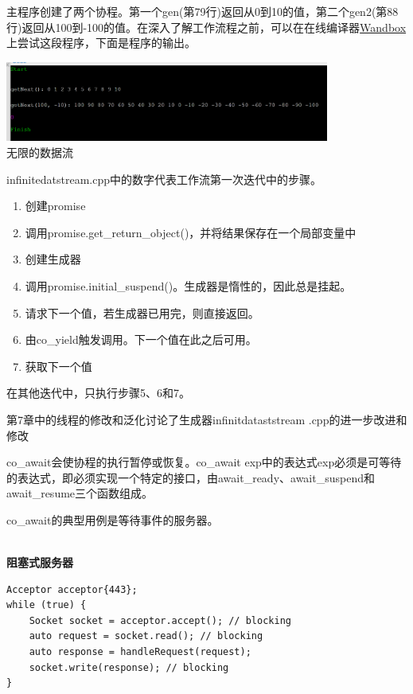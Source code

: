 主程序创建了两个协程。第一个gen(第79行)返回从0到10的值，第二个gen2(第88行)返回从100到-100的值。在深入了解工作流程之前，可以在在线编译器\href{https://wandbox.org/}{Wandbox}上尝试这段程序，下面是程序的输出。

\begin{center}
\includegraphics[width=0.8\textwidth]{content/3/chapter6/images/5.png}\\
无限的数据流
\end{center}

infinitedatstream.cpp中的数字代表工作流第一次迭代中的步骤。

\begin{enumerate}
\item 
创建promise

\item 
调用promise.get\_return\_object()，并将结果保存在一个局部变量中

\item 
创建生成器

\item 
调用promise.initial\_suspend()。生成器是惰性的，因此总是挂起。

\item 
请求下一个值，若生成器已用完，则直接返回。

\item 
由co\_yield触发调用。下一个值在此之后可用。

\item 
获取下一个值
\end{enumerate}

在其他迭代中，只执行步骤5、6和7。

第7章中的线程的修改和泛化讨论了生成器infinitdataststream .cpp的进一步改进和修改


co\_await会使协程的执行暂停或恢复。co\_await exp中的表达式exp必须是可等待的表达式，即必须实现一个特定的接口，由await\_ready、await\_suspend和await\_resume三个函数组成。

co\_await的典型用例是等待事件的服务器。

\hspace*{\fill} \\ %
\noindent
\textbf{阻塞式服务器}
\begin{lstlisting}[style=styleCXX]
Acceptor acceptor{443};
while (true) {
	Socket socket = acceptor.accept(); // blocking
	auto request = socket.read(); // blocking
	auto response = handleRequest(request);
	socket.write(response); // blocking
}
\end{lstlisting}

